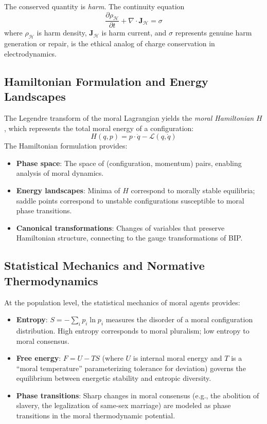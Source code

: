 \documentclass[12pt,letterpaper]{article}
\theoremstyle{definition}
\theoremstyle{plain}
\newcommand{\calH}{\mathcal{H}}
\newcommand{\Lag}{\mathcal{L}}
\begin{document}
The conserved quantity is \emph{harm}. The continuity equation
\begin{equation}
\frac{\partial \rho_\calH}{\partial t} + \nabla \cdot \mathbf{J}_\calH = \sigma
\end{equation}
where $\rho_\calH$ is harm density, $\mathbf{J}_\calH$ is harm current, and $\sigma$ represents genuine harm generation or repair, is the ethical analog of charge conservation in electrodynamics.

\subsection{Hamiltonian Formulation and Energy Landscapes}

The Legendre transform of the moral Lagrangian yields the \emph{moral Hamiltonian} $H$, which represents the total moral energy of a configuration:
\begin{equation}
H(q, p) = p \cdot \dot{q} - \Lag(q, \dot{q})
\end{equation}
The Hamiltonian formulation provides:
\begin{itemize}
    \item \textbf{Phase space}: The space of (configuration, momentum) pairs, enabling analysis of moral dynamics.
    \item \textbf{Energy landscapes}: Minima of $H$ correspond to morally stable equilibria; saddle points correspond to unstable configurations susceptible to moral phase transitions.
    \item \textbf{Canonical transformations}: Changes of variables that preserve Hamiltonian structure, connecting to the gauge transformations of BIP.
\end{itemize}

\subsection{Statistical Mechanics and Normative Thermodynamics}

At the population level, the statistical mechanics of moral agents provides:
\begin{itemize}
    \item \textbf{Entropy}: $S = -\sum_i p_i \ln p_i$ measures the disorder of a moral configuration distribution. High entropy corresponds to moral pluralism; low entropy to moral consensus.
    \item \textbf{Free energy}: $F = U - TS$ (where $U$ is internal moral energy and $T$ is a ``moral temperature'' parameterizing tolerance for deviation) governs the equilibrium between energetic stability and entropic diversity.
    \item \textbf{Phase transitions}: Sharp changes in moral consensus (e.g., the abolition of slavery, the legalization of same-sex marriage) are modeled as phase transitions in the moral thermodynamic potential.
\end{itemize}
\end{document}
